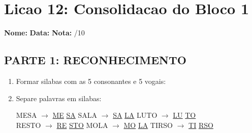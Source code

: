 \section{Licao 12: Consolidacao do Bloco 1}

\rotinasimples
{}



\begin{exercicio}
\noindent\textbf{Nome:} \underline{\hspace{3.2cm}} \quad \textbf{Data:} \underline{\hspace{1.6cm}} \quad \textbf{Nota:} \underline{\hspace{0.9cm}}/10

\subsection*{PARTE 1: RECONHECIMENTO}

\begin{enumerate}
  \item Formar silabas com as 5 consonantes e 5 vogais:
  \begin{center}
  \end{center}

  \item Separe palavras em silabas:
  \begin{center}
  MESA $\rightarrow$ \underline{ME} \underline{SA} \quad SALA $\rightarrow$ \underline{SA} \underline{LA} \quad LUTO $\rightarrow$ \underline{LU} \underline{TO}\\[0.5em]
  RESTO $\rightarrow$ \underline{RE} \underline{STO} \quad MOLA $\rightarrow$ \underline{MO} \underline{LA} \quad TIRSO $\rightarrow$ \underline{TI} \underline{RSO}
  \end{center}


\end{enumerate}
\end{exercicio}
